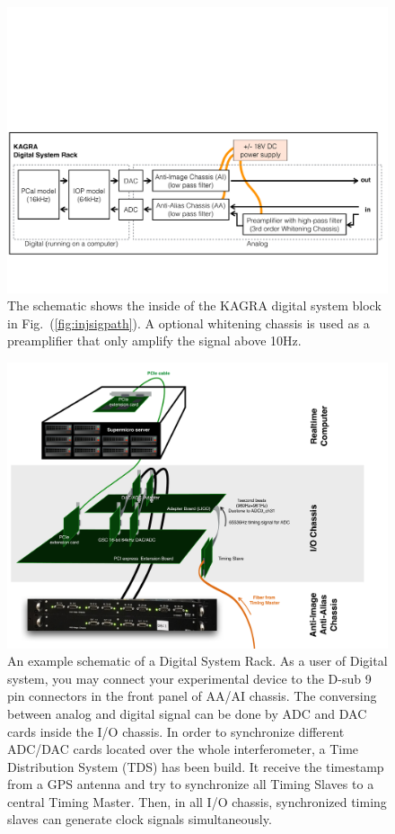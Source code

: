 \begin{figure}[hbt!]
\centering
\includegraphics[width=1\textwidth]{figure/dgs_rack}
\caption[dgs]{The schematic shows the inside of the KAGRA digital system block in Fig.~(\ref{fig:injsigpath}). A optional whitening chassis is used as a preamplifier that only amplify the signal above 10Hz.     }
\label{fig:dgs_rack}
\end{figure}


\begin{figure}[hbt!]
\centering
\includegraphics[width=1\textwidth]{figure/dgs}
\caption[An example schematic of a Digital System Rack]{ An example schematic of a Digital System Rack. As a user of Digital system, you may connect your experimental device to the D-sub 9 pin connectors in the front panel of AA/AI chassis. The conversing between analog and digital signal can be done by ADC and DAC cards inside the I/O chassis. In order to synchronize different ADC/DAC cards located over the whole interferometer, a Time Distribution System (TDS) has been build. It receive the timestamp from a GPS antenna and try to synchronize all Timing Slaves to a central Timing Master. Then, in all I/O chassis, synchronized timing slaves can generate clock signals simultaneously.  }
\label{fig:dgs}
\end{figure}



